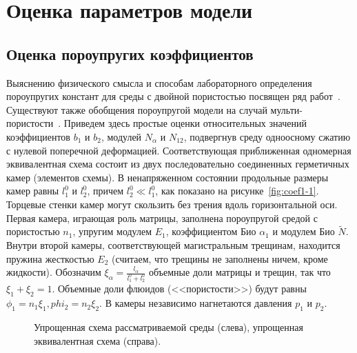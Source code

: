 \chapter{Оценка параметров модели}\label{ch:ch2}

\section{Оценка пороупругих коэффициентов}\label{sec:ch2/sec01}

Выяснению физического смысла и способам лабораторного определения пороупругих констант для среды с двойной пористостью посвящен ряд работ~\autocite{berryman2002models, bai1995poromechanical}. Существуют также обобщения пороупругой модели на случай мульти-пористости~\autocite{mehrabian2015gassmann}. Приведем здесь простые оценки относительных значений коэффициентов $b_1$ и $b_2$, модулей $N_{\alpha}$ и $N_{12}$, подвергнув среду одноосному сжатию с нулевой поперечной деформацией. Соответствующая приближенная одномерная эквивалентная схема состоит из двух последовательно соединенных герметичных камер (элементов схемы). В ненапряженном состоянии продольные размеры камер равны $l_1^0$ и $l_2^0$, причем $l_2^0 \ll l_1^0$, как показано на рисунке~\ref{fig:coef1-1}. Торцевые стенки камер могут скользить без трения вдоль горизонтальной оси. Первая камера, играющая роль матрицы, заполнена пороупругой средой с пористостью $n_1$, упругим модулем $E_1$, коэффициентом Био $\alpha_1$ и модулем Био $\widetilde{N}$. Внутри второй камеры, соответствующей магистральным трещинам, находится пружина жесткостью $E_2$ (считаем, что трещины не заполнены ничем, кроме жидкости). Обозначим $\xi_{\alpha} = \frac{l_{\alpha}}{l_1^0 + l_2^0}$ объемные доли матрицы и трещин, так что $\xi_1 + \xi_2 = 1$. Объемные доли флюидов (<<пористости>>) будут равны $\phi_1 = n_1 \xi_1, phi_2 = n_2 \xi_2$. В камеры независимо нагнетаются давления $p_1$ и $p_2$.

\begin{figure}[ht]
    \caption[Упрощенная схема рассматриваемой среды (слева), упрощенная эквивалентная схема (справа).]{Упрощенная схема рассматриваемой среды (слева), упрощенная эквивалентная схема (справа).}\label{fig:coef1}
\end{figure}

